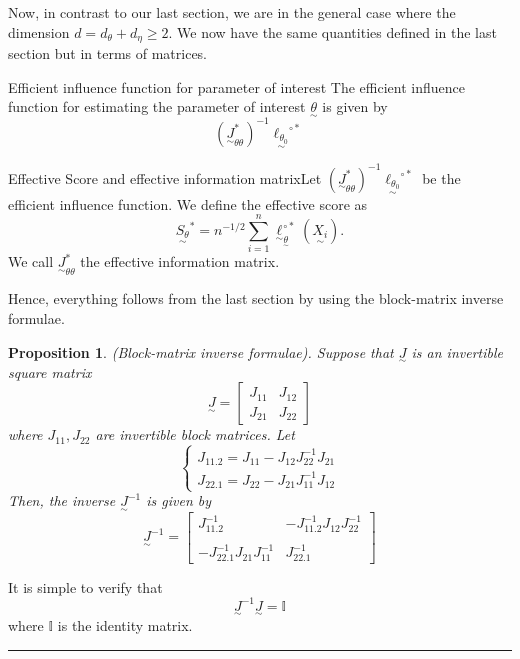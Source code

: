 \documentclass[twoside]{article}
\newtheorem{proposition}[theorem]{Proposition}
\newenvironment{proof}{{\bf Proof:}}{\hfill\rule{2mm}{2mm}}
\newcommand{\utilde}{\underset{\sim}}
\begin{document}
Now, in contrast to our last section, we are in the general case where the dimension $d = d_{\theta} + d_{\eta} \geq 2.$ We now have the same quantities defined in the last section but in terms of matrices.

\begin{definition_exam}{Efficient influence function for parameter of interest}{} The efficient influence function for estimating the parameter of interest $\utilde{\theta}$ is given by 
$$
(\utilde{J}_{\theta \theta}^{*})^{-1}\utilde{\ell_{\theta_{0}}}^{\circ *}
$$
\end{definition_exam}

\begin{definition_exam}{Effective Score and effective information matrix}{}Let $(\utilde{J}_{\theta \theta}^{*})^{-1}\utilde{\ell_{\theta_{0}}}^{\circ *}$ be the efficient influence function. We define the effective score as 
$$
\utilde{S_{\theta}}^{*} = n^{-1/2}\sum_{i=1}^{n}\utilde{\ell}_{\utilde{\theta}}^{\circ *}(\utilde{X_i}).
$$
We call $\utilde{J}_{\theta \theta}^{*}$ the effective information matrix.
\end{definition_exam}

Hence, everything follows from the last section by using the block-matrix inverse formulae.

\begin{proposition}(Block-matrix inverse formulae). Suppose that $\utilde{J}$ is an invertible square matrix
$$
\utilde{J} = 
\begin{bmatrix}
J_{11} & J_{12}\\
J_{21} & J_{22}
\end{bmatrix}
$$
where $J_{11}, J_{22}$ are invertible block matrices. Let 
$$
\begin{cases}
J_{11.2} = J_{11} - J_{12}J_{22}^{-1}J_{21}\\
J_{22.1} = J_{22} - J_{21}J_{11}^{-1}J_{12}
\end{cases}
$$
Then, the inverse $\utilde{J}^{-1}$ is given by 
$$
\utilde{J}^{-1} = 
\begin{bmatrix}
J_{11.2}^{-1} & -J_{11.2}^{-1}J_{12}J_{22}^{-1}\\\\
-J_{22.1}^{-1}J_{21}J_{11}^{-1} & J_{22.1}^{-1}
\end{bmatrix}
$$
\end{proposition}

\begin{proof} It is simple to verify that 
$$
\utilde{J}^{-1}\utilde{J} = \mathbb{I}
$$
where $\mathbb{I}$ is the identity matrix.
\end{proof}
\end{document}
